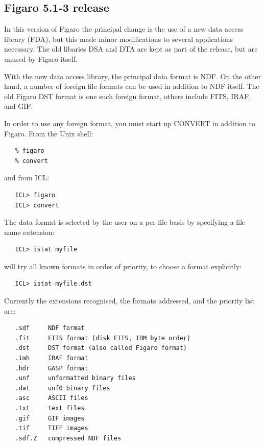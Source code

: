 
\subsection{\label{news513}Figaro 5.1-3 release}

   In this version of Figaro the principal change is the use of a new data
   access library (FDA), but this made minor modifications to several
   applications necessary.  The old libaries DSA and DTA are kept as
   part of the release, but are unused by Figaro itself.

   With the new data access library, the principal data format is NDF.  On
   the other hand, a number of foreign file formats can be used in addition
   to NDF itself.  The old Figaro DST format is one such foreign format,
   others include FITS, IRAF, and GIF.

   In order to use any foreign format, you must start up CONVERT in addition
   to Figaro.  From the Unix shell:

\begin{verbatim}
   % figaro
   % convert
\end{verbatim}

   and from ICL:

\begin{verbatim}
   ICL> figaro
   ICL> convert
\end{verbatim}

   The data format is selected by the user on a per-file basis by specifying
   a file name extension:

\begin{verbatim}
   ICL> istat myfile
\end{verbatim}

   will try all known formats in order of priority, to choose a format
   explicitly:

\begin{verbatim}
   ICL> istat myfile.dst
\end{verbatim}

   Currently the extensions recognised, the formats addressed, and the
   priority list are:

\begin{verbatim}
   .sdf     NDF format
   .fit     FITS format (disk FITS, IBM byte order)
   .dst     DST format (also called Figaro format)
   .imh     IRAF format
   .hdr     GASP format
   .unf     unformatted binary files
   .dat     unf0 binary files
   .asc     ASCII files
   .txt     text files
   .gif     GIF images
   .tif     TIFF images
   .sdf.Z   compressed NDF files
\end{verbatim}

